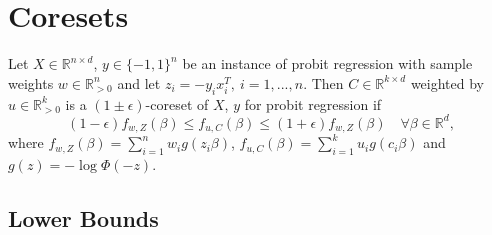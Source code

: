 \section{Coresets}

\begin{definition}
    Let $X \in \mathbb{R}^{n \times d}$, $y \in \{-1, 1\}^n$ be an
    instance of probit regression with sample weights
    $w \in \mathbb{R}^n_{>0}$ and let $z_i = -y_ix_i^T, \ i=1,...,n$.
    Then $C \in \mathbb{R}^{k \times d}$ weighted
    by $u \in \mathbb{R}^k_{>0}$ is a $(1 \pm \epsilon)$-coreset
    of $X$, $y$ for probit regression if
    \begin{equation*}
        \ (1 - \epsilon)f_{w, Z}(\beta)
        \leq f_{u, C}(\beta) \leq (1 + \epsilon)f_{w, Z}(\beta)
        \quad \forall \beta \in \mathbb{R}^d,
    \end{equation*}
    where $f_{w, Z}(\beta) = \sum_{i=1}^n w_i g(z_i \beta)$,
    $f_{u, C}(\beta) = \sum_{i=1}^k u_i g(c_i \beta)$ and
    $g(z) = -\log{\Phi(-z)}$.
\end{definition}

\subsection{Lower Bounds}


